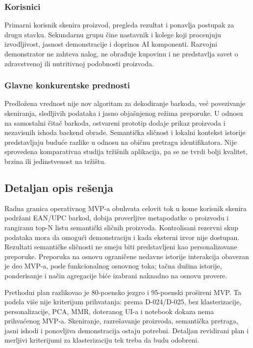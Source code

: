 \documentclass[12pt,a4paper]{article}
\begin{document}
\subsubsection{Korisnici}
Primarni korisnik skenira proizvod, pregleda rezultat i ponavlja postupak za drugu stavku. Sekundarnu grupu čine nastavnik i kolege koji procenjuju izvodljivost, jasnost demonstracije i doprinos AI komponenti. Razvojni demonstrator ne zahteva nalog, ne obrađuje kupovinu i ne predstavlja savet o zdravstvenoj ili nutritivnoj podobnosti proizvoda.

\subsubsection{Glavne konkurentske prednosti}
Predložena vrednost nije nov algoritam za dekodiranje barkoda, već povezivanje skeniranja, sledljivih podataka i jasno objašnjenog režima preporuke. U odnosu na samostalni čitač barkoda, ostvareni prototip dodaje prikaz proizvoda i nezavisnih ishoda backend obrade. Semantička sličnost i lokalni kontekst istorije predstavljaju buduće razlike u odnosu na običnu pretragu identifikatora. Nije sprovedena komparativna studija tržišnih aplikacija, pa se ne tvrdi bolji kvalitet, brzina ili jedinstvenost na tržištu.

\subsection{Detaljan opis rešenja}

Radna granica operativnog MVP-a obuhvata celovit tok u kome korisnik skenira podržani EAN/UPC barkod, dobija proverljive metapodatke o proizvodu i rangiranu top-N listu semantički sličnih proizvoda. Kontrolisani rezervni skup podataka mora da omogući demonstraciju i kada eksterni izvor nije dostupan. Rezultati semantičke sličnosti ne smeju biti predstavljeni kao personalizovane preporuke. Preporuka na osnovu ograničene nedavne istorije interakcija obavezan je deo MVP-a, posle funkcionalnog osnovnog toka; tačna dužina istorije, ponderisanje i način agregacije biće izabrani naknadno na osnovu provere.

Prethodni plan razlikovao je 80-poensko jezgro i 95-poenski prošireni MVP. Ta podela više nije kriterijum prihvatanja: prema D-024/D-025, bez klasterizacije, personalizacije, PCA, MMR, doteranog UI-a i notebook dokaza nema prihvaćenog MVP-a. Skeniranje, razrešavanje proizvoda, semantička pretraga, jasni ishodi i ponovljiva demonstracija ostaju potrebni. Detaljan revidirani plan i merljivi kriterijumi za klasterizaciju tek treba da budu odobreni.
\end{document}
